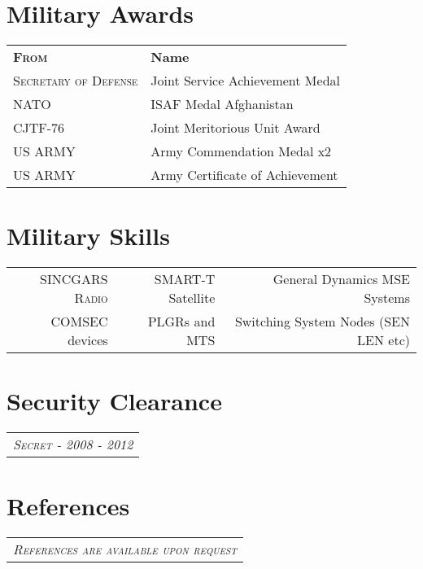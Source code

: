 \documentclass[a4paper,10pt]{article}
\newcommand{\fivenotes}{%
\textcolor{noteone}{\symbol{"2022}}
\textcolor{notetwo}{\symbol{"2022}}
\textcolor{notethree}{\symbol{"2022}}
\textcolor{notefour}{\symbol{"2022}}
\textcolor{notefive}{\symbol{"2022}}
}
\newcommand{\fournotes}{%
\textcolor{noteone}{\symbol{"2022}}
\textcolor{notetwo}{\symbol{"2022}}
\textcolor{notethree}{\symbol{"2022}}
\textcolor{notefour}{\symbol{"2022}}
\textcolor{white}{\symbol{"2022}}
}
\newcommand{\threenotes}{%
\textcolor{noteone}{\symbol{"2022}}
\textcolor{notetwo}{\symbol{"2022}}
\textcolor{notethree}{\symbol{"2022}}
\textcolor{white}{\symbol{"2022}}
\textcolor{white}{\symbol{"2022}}
}
\begin{document}
\section{\textbf{Military Awards}}
\begin{tabular}{l|p{15.5cm}}

  \textsc{\textbf{From}} & \textbf{Name}
    \\ \textsc{Secretary of Defense}  &  Joint Service Achievement Medal 
    \\ \textsc{NATO}                  &  ISAF Medal Afghanistan 
    \\ \textsc{CJTF-76}               & Joint Meritorious Unit Award 
    \\ \textsc{US ARMY}               & Army Commendation Medal x2 
    \\ \textsc{US ARMY}               & Army Certificate of Achievement 
\end{tabular} 

\section{\textbf{Military Skills}}
\begin{tabular}{r|r|r }
  \textsc{SINCGARS Radio}\small\emph{\fivenotes} &
  SMART-T Satellite \small\emph{\fournotes} &
  General Dynamics MSE Systems\small\emph{\fournotes} \\
  COMSEC devices\small\emph{\fournotes} &
  PLGRs and MTS \small\emph{\threenotes} &
  Switching System Nodes (SEN LEN etc) \small\emph{\threenotes}
\end{tabular}

\section{\textbf{Security Clearance}}
\begin{tabular}{p{15.5cm}}
  \textsc{\emph{Secret - 2008 - 2012}}
\end{tabular}

\section{\textbf{References}}
\begin{tabular}{p{15.5cm}}
  \textsc{\emph{References are available upon request}}
\end{tabular}
\end{document}
